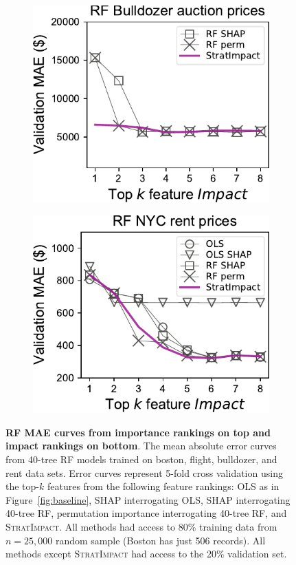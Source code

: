 \documentclass[11pt]{article}
\newcommand{\figref}[1]{Figure~\ref{#1}}
\newcommand{\simp}{\fontfamily{cmr}\textsc{\small StratImpact}}
\begin{document}
\begin{figure}
\begin{subfigure}{.25\textwidth}
    \centering
\includegraphics[scale=0.45]{images/bulldozer-topk-RF-Impact.pdf}
\vspace{-2.5mm}
\subcaption{}
\end{subfigure}%
\hfill
\begin{subfigure}{.245\textwidth}
    \centering
\includegraphics[scale=0.45]{images/rent-topk-RF-Impact.pdf}
\vspace{-7mm}
\subcaption{}
\end{subfigure}
\vspace{-3mm}
\caption[short]{\small {\bf RF MAE curves from {\bf importance} rankings on top and {\bf impact} rankings on bottom}. The mean absolute error curves from 40-tree RF models trained on boston, flight, bulldozer, and rent data sets. Error curves represent 5-fold cross validation using the top-$k$ features from the following feature rankings: OLS as in \figref{fig:baseline}, SHAP interrogating OLS, SHAP interrogating 40-tree RF, permutation importance interrogating 40-tree RF, and \simp{}. All methods had access to 80\% training data from $n=25,000$ random sample (Boston has just 506 records).  All methods except \simp{} had access to the 20\% validation set.}
\label{fig:topk}
\end{figure}
\end{document}
